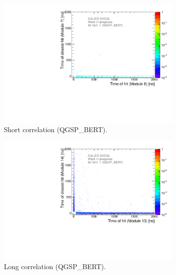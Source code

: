 \begin{figure}[htbp!]
  \begin{subfigure}[t]{0.49\textwidth}
    \centering
    \includegraphics[width=1\textwidth]{../Thesis_Plots/Timing/Pions/Plots/ComparisonToSim/Time_Correlation_50GeV_short_QGSPBERT_DD4hep.pdf}
    \caption{Short correlation (QGSP\_BERT).}\label{fig:Corr_short_QGSPBERT_DD4hep}
  \end{subfigure}
  \hfill
  \begin{subfigure}[t]{0.49\textwidth}
    \centering
    \includegraphics[width=1\textwidth]{../Thesis_Plots/Timing/Pions/Plots/ComparisonToSim/Time_Correlation_50GeV_long_QGSPBERT_DD4hep.pdf}
    \caption{Long correlation (QGSP\_BERT).} \label{fig:Corr_long_QGSPBERT_DD4hep}
  \end{subfigure}
  \hfill
  \begin{subfigure}[t]{0.49\textwidth}

\end{subfigure}
\end{figure}
